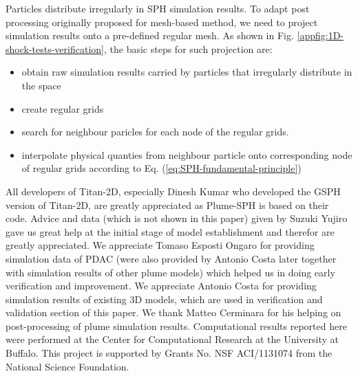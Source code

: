 \documentclass[gmd, manuscript]{copernicus}
\begin{document}
Particles distribute irregularly in SPH simulation results. To adapt post processing originally proposed for mesh-based method, we need to project simulation results onto a pre-defined regular mesh. As shown in Fig. \ref{appfig:1D-shock-tests-verification}, the basic steps for such projection are:
\begin{itemize}
\item obtain raw simulation results carried by particles that irregularly distribute in the space
\item create regular grids
\item search for neighbour paricles for each node of the regular grids.
\item interpolate physical quanties from neighbour particle onto corresponding node of regular grids according to Eq. (\ref{eq:SPH-fundamental-principle})
\end{itemize}

%
%
%


\begin{acknowledgements}
All developers of Titan-2D, especially Dinesh Kumar who developed the GSPH version of Titan-2D, are greatly appreciated as Plume-SPH is based on their code. Advice and data (which is not shown in this paper) given by Suzuki Yujiro gave us great help at the initial stage of model establishment and therefor are greatly appreciated. We appreciate Tomaso Esposti Ongaro for providing simulation data of PDAC (were also provided by Antonio Costa later together with simulation results of other plume models) which helped us in doing early verification and improvement. We appreciate Antonio Costa for providing simulation results of existing 3D models, which are used in verification and validation section of this paper. We thank Matteo Cerminara for his helping on post-processing of plume simulation results. Computational results reported here were performed at the Center for Computational Research at the University at Buffalo. This project is supported by Grants No. NSF ACI/1131074 from the National Science Foundation.
\end{acknowledgements}
\end{document}
